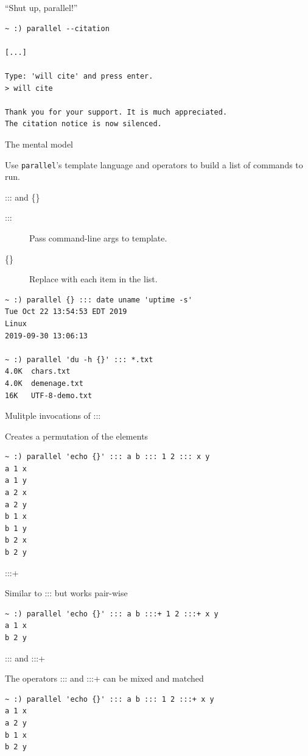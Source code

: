 \documentclass{beamer}
\renewcommand\big[1]{
  \begin{center}
    \Large{#1}
  \end{center}
}
\begin{document}
\begin{frame}[fragile]
  \big{``Shut up, parallel!''}
\begin{verbatim}
~ :) parallel --citation

[...]

Type: 'will cite' and press enter.
> will cite

Thank you for your support. It is much appreciated.
The citation notice is now silenced.
\end{verbatim}
\end{frame}

\begin{frame}
  \big{The mental model}

  Use \texttt{parallel}'s template language and operators to build a list of commands to run.
\end{frame}

\begin{frame}[fragile]
  \big{::: and \{\}}
  \begin{description}
    \item[:::] Pass command-line args to template.
    \item[\{\}] Replace with each item in the list.
  \end{description}

\begin{verbatim}
~ :) parallel {} ::: date uname 'uptime -s'
Tue Oct 22 13:54:53 EDT 2019
Linux
2019-09-30 13:06:13

~ :) parallel 'du -h {}' ::: *.txt
4.0K  chars.txt
4.0K  demenage.txt
16K   UTF-8-demo.txt
\end{verbatim}
\end{frame}

\begin{frame}[fragile]
  \big{Mulitple invocations of :::}
  Creates a permutation of the elements
\begin{verbatim}
~ :) parallel 'echo {}' ::: a b ::: 1 2 ::: x y
a 1 x
a 1 y
a 2 x
a 2 y
b 1 x
b 1 y
b 2 x
b 2 y
\end{verbatim}
\end{frame}

\begin{frame}[fragile]
  \big{:::+}
  Similar to ::: but works pair-wise
\begin{verbatim}
~ :) parallel 'echo {}' ::: a b :::+ 1 2 :::+ x y
a 1 x
b 2 y
\end{verbatim}
\end{frame}

\begin{frame}[fragile]
  \big{::: and :::+}
  The operators ::: and :::+ can be mixed and matched
\begin{verbatim}
~ :) parallel 'echo {}' ::: a b ::: 1 2 :::+ x y
a 1 x
a 2 y
b 1 x
b 2 y
\end{verbatim}
\end{frame}
\end{document}
